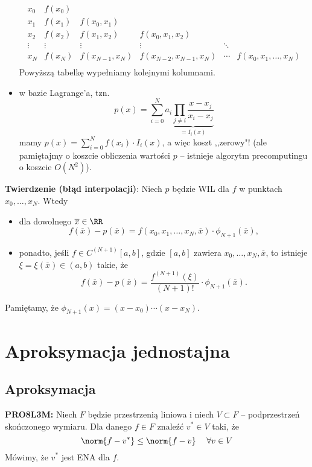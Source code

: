 \begin{itemize}
    $$
    \begin{matrix}
        x_0 & f(x_0) & & & & \\
        x_1 & f(x_1) & f(x_0,x_1) & & & \\
        x_2 & f(x_2) & f(x_1,x_2) & f(x_0,x_1,x_2) & & \\
        \vdots & \vdots & \vdots & \vdots & \ddots & \\
        x_N & f(x_N) & f(x_{N-1},x_N) & f(x_{N-2},x_{N-1},x_N) & \cdots & f(x_0,x_1,\ldots,x_N) \\
    \end{matrix}
    $$
    Powyższą tabelkę wypełniamy kolejnymi kolumnami.
    \item w bazie Lagrange'a, tzn.
    $$
    p(x)=\sum_{i=0}^Na_i\underbrace{\prod_{j\neq i}\frac{x-x_j}{x_i-x_j}}_{=I_i(x)}
    $$
    mamy $p(x)=\sum_{i=0}^N f(x_i)\cdot I_i(x)$, a więc koszt ,,zerowy"! (ale pamiętajmy o koszcie obliczenia wartości $p$ -- istnieje algorytm precomputingu o koszcie $O(N^2)$).
\end{itemize}

\textbf{Twierdzenie (błąd interpolacji)}:
Niech $p$ będzie WIL dla $f$ w punktach $x_0,\ldots,x_N$. Wtedy
\begin{itemize}
    \item dla dowolnego $\overline{x}\in\RR$
    $$
    f(\overline{x})-p(\overline{x})=f(x_0,x_1,\ldots,x_N,\overline{x})\cdot\phi_{N+1}(\overline{x}),
    $$
    \item ponadto, jeśli $f\in C^{(N+1)}[a,b]$, gdzie $[a,b]$ zawiera $x_0,\ldots,x_N,\overline{x}$, to istnieje $\xi=\xi(\overline{x})\in(a,b)$ takie, że
    $$
    f(\overline{x})-p(\overline{x})=\frac{f^{(N+1)}(\xi)}{(N+1)!}\cdot\phi_{N+1}(\overline{x}).
    $$
\end{itemize}
Pamiętamy, że $\phi_{N+1}(x)=(x-x_0)\cdots(x-x_N)$.

\section{Aproksymacja jednostajna}

\subsection{Aproksymacja}
\textbf{PRO8L3M:} Niech $F$ będzie przestrzenią liniowa i niech $V \subset F$ -- podprzestrzeń skończonego wymiaru. Dla danego $f \in F$ znaleźć $v^* \in V$ taki, że
$$
\norm{f - v^*} \leq \norm{f - v} \quad \; \forall v \in V
$$
Mówimy, że $v^*$ jest ENA dla $f$.\\

